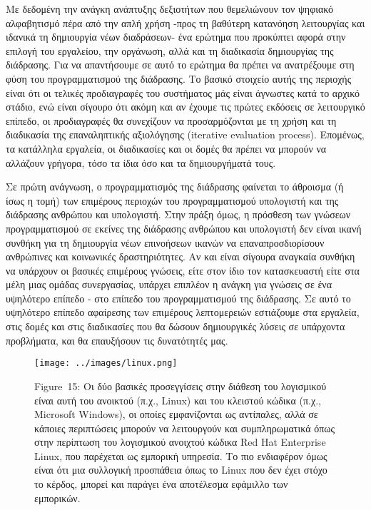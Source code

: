 \documentclass[
]{article}
\begin{document}
Με δεδομένη την ανάγκη ανάπτυξης δεξιοτήτων που θεμελιώνουν τον ψηφιακό
αλφαβητισμό πέρα από την απλή χρήση -προς τη βαθύτερη κατανόηση
λειτουργίας και ιδανικά τη δημιουργία νέων διαδράσεων- ένα ερώτημα που
προκύπτει αφορά στην επιλογή του εργαλείου, την οργάνωση, αλλά και τη
διαδικασία δημιουργίας της διάδρασης. Για να απαντήσουμε σε αυτό το
ερώτημα θα πρέπει να ανατρέξουμε στη φύση του προγραμματισμού της
διάδρασης. Το βασικό στοιχείο αυτής της περιοχής είναι ότι οι τελικές
προδιαγραφές του συστήματος μάς είναι άγνωστες κατά το αρχικό στάδιο,
ενώ είναι σίγουρο ότι ακόμη και αν έχουμε τις πρώτες εκδόσεις σε
λειτουργικό επίπεδο, οι προδιαγραφές θα συνεχίζουν να προσαρμόζονται με
τη χρήση και τη διαδικασία της επαναληπτικής αξιολόγησης (iterative
evaluation process). Επομένως, τα κατάλληλα εργαλεία, οι διαδικασίες και
οι δομές θα πρέπει να μπορούν να αλλάζουν γρήγορα, τόσο τα ίδια όσο και
τα δημιουργήματά τους.

Σε πρώτη ανάγνωση, ο προγραμματισμός της διάδρασης φαίνεται το άθροισμα
(ή ίσως η τομή) των επιμέρους περιοχών του προγραμματισμού υπολογιστή
και της διάδρασης ανθρώπου και υπολογιστή. Στην πράξη όμως, η πρόσθεση
των γνώσεων προγραμματισμού σε εκείνες της διάδρασης ανθρώπου και
υπολογιστή δεν είναι ικανή συνθήκη για τη δημιουργία νέων επινοήσεων
ικανών να επαναπροσδιορίσουν ανθρώπινες και κοινωνικές δραστηριότητες.
Αν και είναι σίγουρα αναγκαία συνθήκη να υπάρχουν οι βασικές επιμέρους
γνώσεις, είτε στον ίδιο τον κατασκευαστή είτε στα μέλη μιας ομάδας
συνεργασίας, υπάρχει επιπλέον η ανάγκη για γνώσεις σε ένα υψηλότερο
επίπεδο - στο επίπεδο του προγραμματισμού της διάδρασης. Σε αυτό το
υψηλότερο επίπεδο αφαίρεσης των επιμέρους λεπτομερειών εστιάζουμε στα
εργαλεία, στις δομές και στις διαδικασίες που θα δώσουν δημιουργικές
λύσεις σε υπάρχοντα προβλήματα, και θα επαυξήσουν τις δυνατότητές μας.

\leavevmode{}%
\begin{figure}
\hypertarget{fig:linux}{%
\centering
\texttt{[image: ../images/linux.png]}
\caption{Figure~15: Οι δύο βασικές προσεγγίσεις στην διάθεση του
λογισμικού είναι αυτή του ανοικτού (π.χ., Linux) και του κλειστού κώδικα
(π.χ., Microsoft Windows), οι οποίες εμφανίζονται ως αντίπαλες, αλλά σε
κάποιες περιπτώσεις μπορούν να λειτουργούν και συμπληρωματικά όπως στην
περίπτωση του λογισμικού ανοιχτού κώδικα Red Hat Enterprise Linux, που
παρέχεται ως εμπορική υπηρεσία. Το πιο ενδιαφέρον όμως είναι ότι μια
συλλογική προσπάθεια όπως το Linux που δεν έχει στόχο το κέρδος, μπορεί
και παράγει ένα αποτέλεσμα εφάμιλλο των εμπορικών.}\label{fig:linux}
}
\end{figure}
\end{document}
